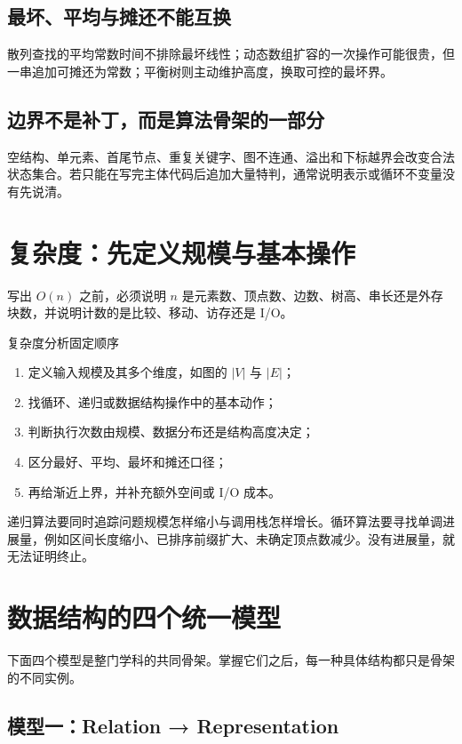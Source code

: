 \documentclass[11pt,a4paper,openany]{ctexbook}
\begin{document}
\subsection{最坏、平均与摊还不能互换}
散列查找的平均常数时间不排除最坏线性；动态数组扩容的一次操作可能很贵，但一串追加可摊还为常数；平衡树则主动维护高度，换取可控的最坏界。

\subsection{边界不是补丁，而是算法骨架的一部分}
空结构、单元素、首尾节点、重复关键字、图不连通、溢出和下标越界会改变合法状态集合。若只能在写完主体代码后追加大量特判，通常说明表示或循环不变量没有先说清。

\section{复杂度：先定义规模与基本操作}
写出 $O(n)$ 之前，必须说明 $n$ 是元素数、顶点数、边数、树高、串长还是外存块数，并说明计数的是比较、移动、访存还是 I/O。

\begin{methodbox}{复杂度分析固定顺序}
\begin{enumerate}
  \item 定义输入规模及其多个维度，如图的 $|V|$ 与 $|E|$；
  \item 找循环、递归或数据结构操作中的基本动作；
  \item 判断执行次数由规模、数据分布还是结构高度决定；
  \item 区分最好、平均、最坏和摊还口径；
  \item 再给渐近上界，并补充额外空间或 I/O 成本。
\end{enumerate}
\end{methodbox}

递归算法要同时追踪问题规模怎样缩小与调用栈怎样增长。循环算法要寻找单调进展量，例如区间长度缩小、已排序前缀扩大、未确定顶点数减少。没有进展量，就无法证明终止。

\section{数据结构的四个统一模型}

下面四个模型是整门学科的共同骨架。掌握它们之后，每一种具体结构都只是骨架的不同实例。

\subsection{模型一：Relation → Representation}
\end{document}
